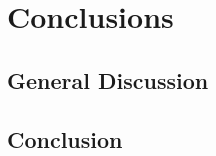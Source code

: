 \documentclass{book}
\begin{document}
	\part{Conclusions}
	\chapter{General Discussion}
	\chapter{Conclusion}
	
\end{document}
